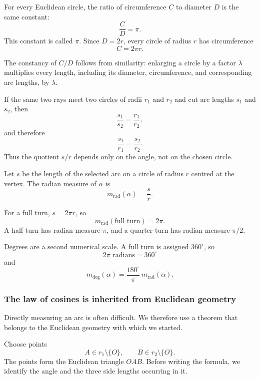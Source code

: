 \begin{theorembox}
For every Euclidean circle, the ratio of circumference $C$ to diameter $D$ is
the same constant:
\[
\frac{C}{D}=\pi.
\]
This constant is called $\pi$. Since $D=2r$, every circle of radius $r$ has
circumference
\[
\boxed{C=2\pi r}.
\]
\end{theorembox}

The constancy of $C/D$ follows from similarity: enlarging a circle by a factor
$\lambda$ multiplies every length, including its diameter, circumference, and
corresponding arc lengths, by $\lambda$.

If the same two rays meet two circles of radii $r_1$ and $r_2$ and cut arc
lengths $s_1$ and $s_2$, then
\[
\frac{s_1}{s_2}=\frac{r_1}{r_2},
\]
and therefore
\[
\frac{s_1}{r_1}=\frac{s_2}{r_2}.
\]
Thus the quotient $s/r$ depends only on the angle, not on the chosen circle.

\begin{definitionbox}
Let $s$ be the length of the selected arc on a circle of radius $r$ centred at
the vertex. The radian measure of $\alpha$ is
\[
\boxed{m_{\mathrm{rad}}(\alpha)=\frac{s}{r}}.
\]
\end{definitionbox}

For a full turn, $s=2\pi r$, so
\[
m_{\mathrm{rad}}(\text{full turn})=2\pi.
\]
A half-turn has radian measure $\pi$, and a quarter-turn has radian measure
$\pi/2$.

Degrees are a second numerical scale. A full turn is assigned $360^\circ$, so
\[
2\pi\text{ radians}=360^\circ
\]
and
\[
\boxed{
m_{\deg}(\alpha)
=
\frac{180^\circ}{\pi}\,m_{\mathrm{rad}}(\alpha)
}.
\]

\subsubsection*{The law of cosines is inherited from Euclidean geometry}

Directly measuring an arc is often difficult. We therefore use a theorem that
belongs to the Euclidean geometry with which we started.

Choose points
\[
A\in r_1\setminus\{O\},
\qquad
B\in r_2\setminus\{O\}.
\]
The points form the Euclidean triangle $OAB$. Before writing the formula, we
identify the angle and the three side lengths occurring in it.

